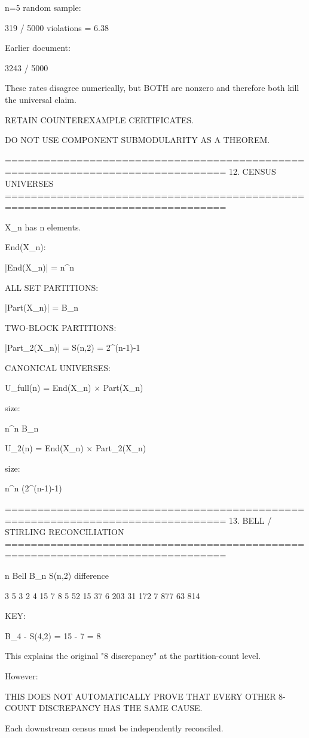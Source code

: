 n=5 random sample:

319 / 5000 violations
= 6.38%

Earlier document:

3243 / 5000

These rates disagree numerically, but BOTH are nonzero and therefore both
kill the universal claim.

RETAIN COUNTEREXAMPLE CERTIFICATES.

DO NOT USE COMPONENT SUBMODULARITY AS A THEOREM.

================================================================================
12. CENSUS UNIVERSES
================================================================================

X_n has n elements.

End(X_n):

|End(X_n)| = n^n

ALL SET PARTITIONS:

|Part(X_n)| = B_n

TWO-BLOCK PARTITIONS:

|Part_2(X_n)| = S(n,2)
              = 2^(n-1)-1

CANONICAL UNIVERSES:

U_full(n)
=
End(X_n) × Part(X_n)

size:

n^n B_n

U_2(n)
=
End(X_n) × Part_2(X_n)

size:

n^n (2^(n-1)-1)

================================================================================
13. BELL / STIRLING RECONCILIATION
================================================================================

n     Bell B_n    S(n,2)    difference

3        5          3           2
4       15          7           8
5       52         15          37
6      203         31         172
7      877         63         814

KEY:

B_4 - S(4,2)
=
15 - 7
=
8

This explains the original "8 discrepancy" at the partition-count level.

However:

THIS DOES NOT AUTOMATICALLY PROVE THAT EVERY OTHER
8-COUNT DISCREPANCY HAS THE SAME CAUSE.

Each downstream census must be independently reconciled.

